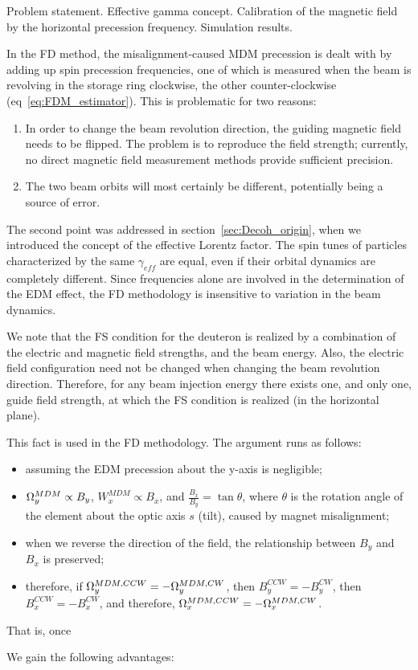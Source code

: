 \documentclass{article}
\begin{document}
Problem statement. Effective gamma concept. Calibration of the magnetic field by the horizontal precession frequency. Simulation results.
\newpage


In the FD method, the misalignment-caused MDM precession is dealt with by adding up spin precession frequencies, one of which is measured when the beam is revolving in the storage ring clockwise, the other counter-clockwise (eq~\eqref{eq:FDM_estimator}). This is problematic for two reasons:
\begin{enumerate}
\item In order to change the beam revolution direction, the guiding magnetic field needs to be flipped. The problem is to reproduce the field strength; currently, no direct magnetic field measurement methods provide sufficient precision.
\item The two beam orbits will most certainly be different, potentially being a source of error.
\end{enumerate}

The second point was addressed in section~\ref{sec:Decoh_origin}, when we introduced the concept of the effective Lorentz factor. The spin tunes of particles characterized by the same $\gamma_{eff}$ are equal, even if their orbital dynamics are completely different. Since frequencies alone are involved in the determination of the EDM effect, the FD methodology is insensitive to variation in the beam dynamics.


We note that the FS condition for the deuteron is realized by a combination of the electric and magnetic field strengths, and the beam energy. Also, the electric field configuration need not be changed when changing the beam revolution direction. Therefore, for any beam injection energy there exists one, and only one, guide field strength, at which the FS condition is realized (in the horizontal plane).

This fact is used in the FD methodology. The argument runs as follows:
\begin{itemize}
\item assuming the EDM precession about the y-axis is negligible;
  \item $\Omega_y^{MDM}\propto B_y$, $W_x^{MDM}\propto B_x$, and $\frac{B_x}{B_y} = \tan\theta$, where $\theta$ is the rotation angle of the element about the optic axis $s$ (tilt), caused by magnet misalignment;
\item when we reverse the direction of the field, the relationship between $B_y$ and $B_x$ is preserved;
\item therefore, if $\Omega_y^{MDM, CCW} = -\Omega_y^{MDM, CW}$, then $B_y^{CCW} = -B_y^{CW}$, then $B_x^{CCW} = -B_x^{CW}$, and therefore, $\Omega_x^{MDM, CCW} = -\Omega_x^{MDM, CW}$.
\end{itemize}
That is, once 

We gain the following advantages: 
\end{document}
